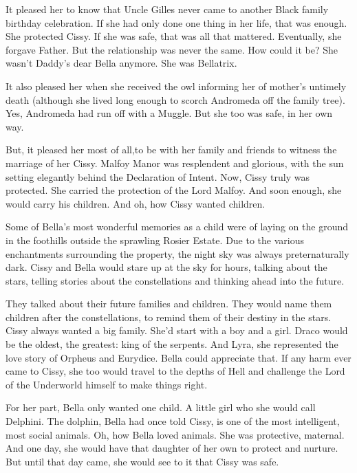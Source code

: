 
It pleased her to know that Uncle Gilles never came to another Black family birthday celebration. If she had only done one thing in her life, that was enough. She protected Cissy. If she was safe, that was all that mattered. Eventually, she forgave Father. But the relationship was never the same. How could it be? She wasn’t Daddy’s dear Bella anymore. She was Bellatrix.

It also pleased her when she received the owl informing her of mother’s untimely death (although she lived long enough to scorch Andromeda off the family tree). Yes, Andromeda had run off with a Muggle. But she too was safe, in her own way.

But, it pleased her most of all,to be with her family and friends to witness the marriage of her Cissy. Malfoy Manor was resplendent and glorious, with the sun setting elegantly behind the Declaration of Intent. Now, Cissy truly was protected. She carried the protection of the Lord Malfoy. And soon enough, she would carry his children. And oh, how Cissy wanted children.

Some of Bella’s most wonderful memories as a child were of laying on the ground in the foothills outside the sprawling Rosier Estate. Due to the various enchantments surrounding the property, the night sky was always preternaturally dark. Cissy and Bella would stare up at the sky for hours, talking about the stars, telling stories about the constellations and thinking ahead into the future.

They talked about their future families and children. They would name them children after the constellations, to remind them of their destiny in the stars. Cissy always wanted a big family. She’d start with a boy and a girl. Draco would be the oldest, the greatest: king of the serpents. And Lyra, she represented the love story of Orpheus and Eurydice. Bella could appreciate that. If any harm ever came to Cissy, she too would travel to the depths of Hell and challenge the Lord of the Underworld himself to make things right.

For her part, Bella only wanted one child. A little girl who she would call Delphini. The dolphin, Bella had once told Cissy, is one of the most intelligent, most social animals. Oh, how Bella loved animals. She was protective, maternal. And one day, she would have that daughter of her own to protect and nurture. But until that day came, she would see to it that Cissy was safe.

